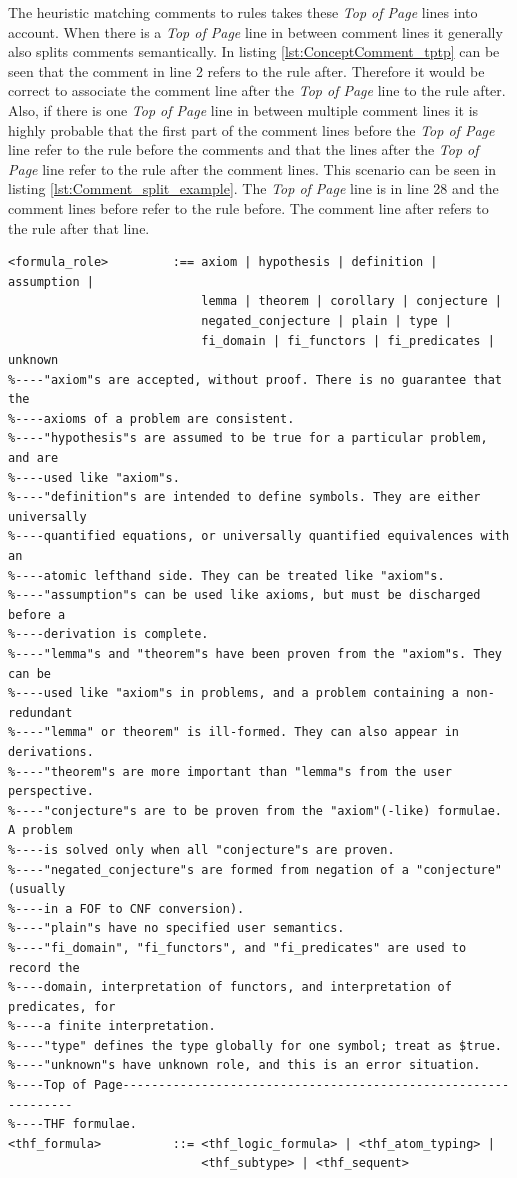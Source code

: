 The heuristic matching comments to rules takes these \textit{Top of Page} lines into account.
When there is a \textit{Top of Page} line in between comment lines it generally also splits comments semantically.
In listing \ref{lst:ConceptComment_tptp} can be seen that the comment in line 2 refers to the rule after.
Therefore it would be correct to associate the comment line after the \textit{Top of Page} line to the rule after.
Also, if there is one \textit{Top of Page} line in between multiple comment lines it is highly probable that the first part of the comment lines before the \textit{Top of Page} line refer to the rule before the comments and that the lines after the \textit{Top of Page} line refer to the rule after the comment lines.
This scenario can be seen in listing \ref{lst:Comment_split_example}.
The \textit{Top of Page} line is in line 28 and the comment lines before refer to the rule before.
The comment line after refers to the rule after that line.
\begin{lstlisting}[language=none, basicstyle=\scriptsize	,caption=Comment lines split by a \textit{Top of Page} line in the \ac{TPTP} syntax,label= lst:Comment_split_example]
<formula_role>         :== axiom | hypothesis | definition | assumption |
                           lemma | theorem | corollary | conjecture |
                           negated_conjecture | plain | type |
                           fi_domain | fi_functors | fi_predicates | unknown
%----"axiom"s are accepted, without proof. There is no guarantee that the
%----axioms of a problem are consistent.
%----"hypothesis"s are assumed to be true for a particular problem, and are
%----used like "axiom"s.
%----"definition"s are intended to define symbols. They are either universally
%----quantified equations, or universally quantified equivalences with an
%----atomic lefthand side. They can be treated like "axiom"s.
%----"assumption"s can be used like axioms, but must be discharged before a
%----derivation is complete.
%----"lemma"s and "theorem"s have been proven from the "axiom"s. They can be
%----used like "axiom"s in problems, and a problem containing a non-redundant
%----"lemma" or theorem" is ill-formed. They can also appear in derivations.
%----"theorem"s are more important than "lemma"s from the user perspective.
%----"conjecture"s are to be proven from the "axiom"(-like) formulae. A problem
%----is solved only when all "conjecture"s are proven.
%----"negated_conjecture"s are formed from negation of a "conjecture" (usually
%----in a FOF to CNF conversion).
%----"plain"s have no specified user semantics.
%----"fi_domain", "fi_functors", and "fi_predicates" are used to record the
%----domain, interpretation of functors, and interpretation of predicates, for
%----a finite interpretation.
%----"type" defines the type globally for one symbol; treat as $true.
%----"unknown"s have unknown role, and this is an error situation.
%----Top of Page---------------------------------------------------------------
%----THF formulae.
<thf_formula>          ::= <thf_logic_formula> | <thf_atom_typing> |
                           <thf_subtype> | <thf_sequent>
\end{lstlisting}

